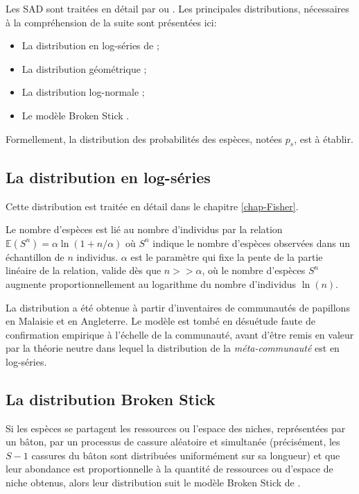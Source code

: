 \documentclass[
  11pt,
  french,
  a4paper,
  extrafontsizes,onecolumn,openright
  ]{memoir}
\providecommand{\tightlist}{%
  \setlength{\itemsep}{0pt}\setlength{\parskip}{0pt}}
\begin{document}
\normalsize

Les SAD sont traitées en détail par \textcite{Magurran1988} ou \textcite{McGill2007}.
Les principales distributions, nécessaires à la compréhension de la suite sont présentées ici:

\begin{itemize}
\tightlist
\item
  La distribution en log-séries de \textcite{Fisher1943};
\item
  La distribution géométrique \autocite{Motomura1932,Whittaker1972};
\item
  La distribution log-normale \autocite{Preston1948};
\item
  Le modèle Broken Stick \autocite{MacArthur1957}.
\end{itemize}

Formellement, la distribution des probabilités des espèces, notées \(p_s\), est à établir.

\subsection{La distribution en log-séries}\label{la-distribution-en-log-suxe9ries}

Cette distribution est traitée en détail dans le chapitre \ref{chap-Fisher}.

Le nombre d'espèces est lié au nombre d'individus par la relation \({\mathbb E}(S^n)=\alpha\ln(1+n/\alpha)\) où \(S^n\) indique le nombre d'espèces observées dans un échantillon de \(n\) individus.
\(\alpha\) est le paramètre qui fixe la pente de la partie linéaire de la relation, valide dès que \(n>>\alpha\), où le nombre d'espèces \(S^n\) augmente proportionnellement au logarithme du nombre d'individus \(\ln(n)\).

La distribution a été obtenue à partir d'inventaires de communautés de papillons en Malaisie et en Angleterre.
Le modèle est tombé en désuétude faute de confirmation empirique à l'échelle de la communauté, avant d'être remis en valeur par la théorie neutre \autocite{Hubbell2001} dans lequel la distribution de la \emph{méta-communauté} est en log-séries.

\subsection{La distribution Broken Stick}\label{la-distribution-broken-stick}

Si les espèces se partagent les ressources ou l'espace des niches, représentées par un bâton, par un processus de cassure aléatoire et simultanée (précisément, les \(S-1\) cassures du bâton sont distribuées uniformément sur sa longueur) et que leur abondance est proportionnelle à la quantité de ressources ou d'espace de niche obtenus, alors leur distribution suit le modèle Broken Stick de \textcite{MacArthur1957}.
\end{document}
